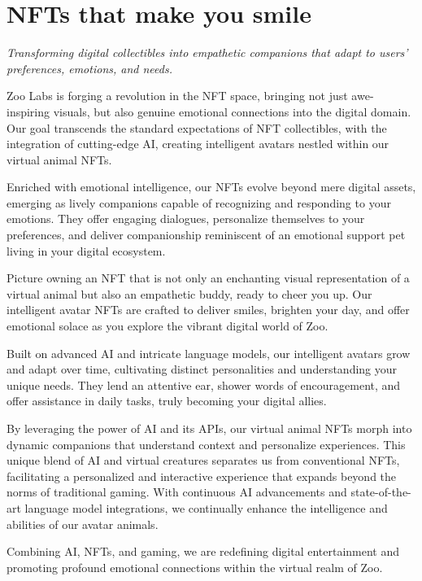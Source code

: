 \section{NFTs that make you smile}
\label{sec:nfts-smile}

\textit{Transforming digital collectibles into empathetic companions that adapt to users' preferences, emotions, and needs.}

Zoo Labs is forging a revolution in the NFT space, bringing not just awe-inspiring visuals, but also genuine emotional connections into the digital domain. Our goal transcends the standard expectations of NFT collectibles, with the integration of cutting-edge AI, creating intelligent avatars nestled within our virtual animal NFTs.

Enriched with emotional intelligence, our NFTs evolve beyond mere digital assets, emerging as lively companions capable of recognizing and responding to your emotions. They offer engaging dialogues, personalize themselves to your preferences, and deliver companionship reminiscent of an emotional support pet living in your digital ecosystem.

Picture owning an NFT that is not only an enchanting visual representation of a virtual animal but also an empathetic buddy, ready to cheer you up. Our intelligent avatar NFTs are crafted to deliver smiles, brighten your day, and offer emotional solace as you explore the vibrant digital world of Zoo.

Built on advanced AI and intricate language models, our intelligent avatars grow and adapt over time, cultivating distinct personalities and understanding your unique needs. They lend an attentive ear, shower words of encouragement, and offer assistance in daily tasks, truly becoming your digital allies.

By leveraging the power of AI and its APIs, our virtual animal NFTs morph into dynamic companions that understand context and personalize experiences. This unique blend of AI and virtual creatures separates us from conventional NFTs, facilitating a personalized and interactive experience that expands beyond the norms of traditional gaming. With continuous AI advancements and state-of-the-art language model integrations, we continually enhance the intelligence and abilities of our avatar animals.

Combining AI, NFTs, and gaming, we are redefining digital entertainment and promoting profound emotional connections within the virtual realm of Zoo.


